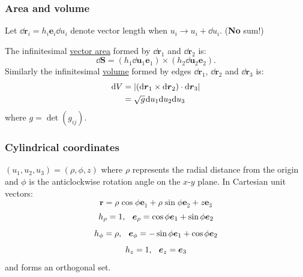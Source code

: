 \documentclass{article}
\newcommand{\vc}[1]{\boldsymbol{#1}}
\begin{document}
\begin{multicols*}{3}
\subsubsection*{Area and volume}
Let $\dd\vc{r}_i=h_i\vc{e}_i\dd u_i$ denote
vector length when
$u_i\rightarrow u_i+\dd u_i$.
(\textbf{No} sum!)

The infinitesimal \underline{vector area}
formed by $\dd\vc{r}_1$
and $\dd\vc{r}_2$ is:
$$\dd\vc{S}=(h_1\dd\vc{u}_1\vc{e}_1)
\times(h_2\dd\vc{u}_2\vc{e}_2).$$
Similarly the infinitesimal \underline{volume} 
formed by edges $\dd\vc{r}_1$, $\dd\vc{r}_2$
and $\dd\vc{r}_3$ is:
\begin{align*}
    \dd V&=|(\dd\vc{r}_1\times\dd\vc{r}_2)
    \cdot\dd\vc{r}_3| \\
    &=\sqrt{g}\hspace{0.01in}\dd u_1\dd u_2\dd u_3
\end{align*}
where $g=\det(g_{ij})$.

\subsubsection*{Cylindrical coordinates}
$(u_1,u_2,u_3)=(\rho,\phi,z)$ where $\rho$
represents the radial distance from the origin
and $\phi$ is the anticlockwise rotation angle
on the $x$-$y$ plane. In Cartesian unit vectors:
$$\vc{r}=\rho\cos\phi\vc{e}_1
+\rho\sin\phi\vc{e}_2+z\vc{e}_3$$
$$h_{\rho}=1,
\hspace{0.1in}
\vc{e}_{\rho}=\cos\phi\vc{e}_1+\sin\phi\vc{e}_2$$
$$h_{\phi}=\rho,
\hspace{0.1in}
\vc{e}_{\phi}=-\sin\phi\vc{e}_1+\cos\phi\vc{e}_2$$
$$h_z=1,
\hspace{0.1in}
\vc{e}_{z}=\vc{e}_3$$
and forms an orthogonal set.


\end{multicols*}
\end{document}
